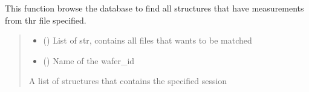 \documentclass[letterpaper,10pt,english]{sphinxmanual}
\begin{document}
\begin{fulllineitems}
\label{\detokenize{filter:filter.filter_by_session}}
\pysigstartsignatures
{}
\pysigstopsignatures
\sphinxAtStartPar
This function browse the database to find all structures that have measurements from thr file specified.
\begin{quote}\begin{description}
\begin{itemize}
\item {} 
\sphinxAtStartPar
{} () \textendash{} List of str, contains all files that wants to be matched

\item {} 
\sphinxAtStartPar
{} () \textendash{} Name of the wafer\_id

\end{itemize}

\sphinxAtStartPar
A list of structures that contains the specified session

\end{description}\end{quote}

\end{fulllineitems}

\end{document}

